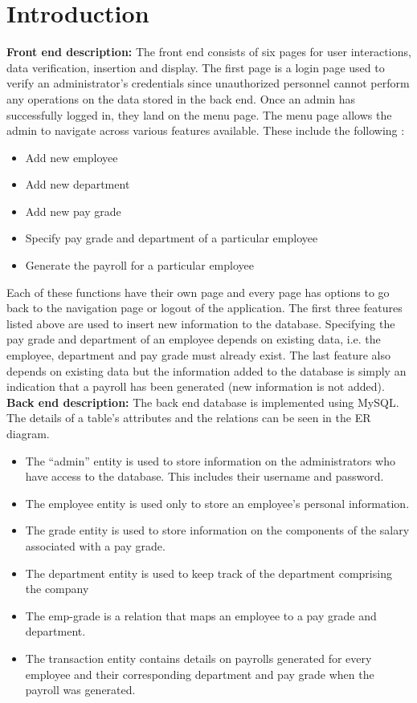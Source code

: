 \documentclass[12pt]{article}
\begin{document}
\section{Introduction}  %
\textbf{Front end description:}
\newline
\newline
The front end consists of six pages for user interactions, data verification, insertion and display. The first page is a login page used to verify an administrator's credentials since unauthorized personnel cannot perform any operations on the data stored in the back end. Once an admin has successfully logged in, they land on the menu page.
\newline
\newline
The menu page allows the admin to navigate across various features available. These include the following :
\begin{itemize}
    \item Add new employee
    \item Add new department
    \item Add new pay grade
    \item Specify pay grade and department of a particular employee
    \item Generate the payroll for a particular employee
\end{itemize}
Each of these functions have their own page and every page has options to go back to the navigation page or logout of the application.
\newline
\newline
The first three features listed above are used to insert new information to the database. Specifying the pay grade and department of an employee depends on existing data, i.e. the employee, department and pay grade must already exist. The last feature also depends on existing data but the information added to the database is simply an indication that a payroll has been generated (new information is not added).
\newpage
\noindent
\textbf{Back end description:}
\newline
\newline
The back end database is implemented using MySQL. The details of a table's attributes and the relations can be seen in the ER diagram.
\begin{itemize}
    \item The “admin” entity is used to store information on the administrators who have access to the database. This includes their username and password.
    \item The employee entity is used only to store an employee’s personal information.
    \item The grade entity is used to store information on the components of the salary associated with a pay grade.
    \item The department entity is used to keep track of the department comprising the company
    \item The emp-grade is a relation that maps an employee to a pay grade and department.
    \item The transaction entity contains details on payrolls generated for every employee and their corresponding department and pay grade when the payroll was generated.
\end{itemize}
\end{document}

